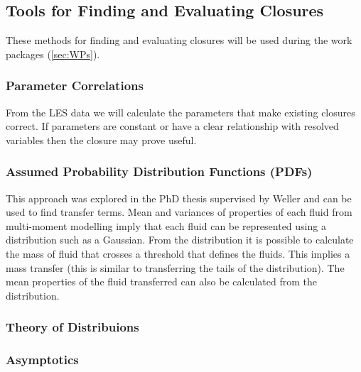 \documentclass[11pt,a4paper]{article}
\begin{document}
\subsection{Tools for Finding and Evaluating Closures}
\label{sec:tools}

These methods for finding and evaluating closures will be used during the work packages (\ref{sec:WPs}).

\subsubsection*{Parameter Correlations}

From the LES data we will calculate the parameters that make existing closures correct. If  parameters are constant or have a clear relationship with resolved variables then the closure may prove useful.

\subsubsection*{Assumed Probability Distribution Functions (PDFs)}

This approach was explored in the PhD thesis \cite{McIn20} supervised by Weller and can be used to find transfer terms. Mean and variances of properties of each fluid from multi-moment modelling imply that each fluid can be represented using a distribution such as a Gaussian. From the distribution it is possible to calculate the mass of fluid that crosses a threshold that defines the fluids. This implies a mass transfer (this is similar to transferring the tails of the distribution). The mean properties of the fluid transferred can also be calculated from the distribution. 

\subsubsection*{Theory of Distribuions}

\subsubsection*{Asymptotics}
\end{document}
